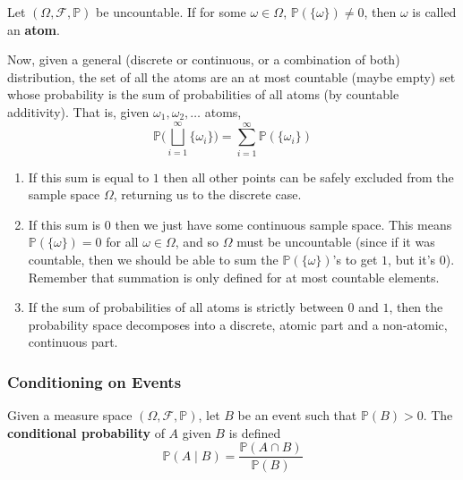 \documentclass{article}
\begin{document}
      \begin{definition}[Atom]
        Let $(\Omega, \mathcal{F}, \mathbb{P})$ be uncountable. If for some $\omega \in \Omega$, $\mathbb{P}(\{\omega\}) \neq 0$, then $\omega$ is called an \textbf{atom}. 
      \end{definition}

      Now, given a general (discrete or continuous, or a combination of both) distribution, the set of all the atoms are an at most countable (maybe empty) set whose probability is the sum of probabilities of all atoms (by countable additivity). That is, given $\omega_1, \omega_2, \ldots$ atoms, 
      \begin{equation}
        \mathbb{P} \bigg( \bigsqcup_{i=1}^\infty \{\omega_i\} \bigg) = \sum_{i=1}^\infty \mathbb{P}(\{\omega_i\})
      \end{equation}
      \begin{enumerate}
        \item If this sum is equal to $1$ then all other points can be safely excluded from the sample space $\Omega$, returning us to the discrete case. 
        \item If this sum is $0$ then we just have some continuous sample space. This means $\mathbb{P}(\{\omega\}) = 0$ for all $\omega \in \Omega$, and so $\Omega$ must be uncountable (since if it was countable, then we should be able to sum the $\mathbb{P}(\{\omega\})$'s to get $1$, but it's $0$). Remember that summation is only defined for at most countable elements. 
        \item If the sum of probabilities of all atoms is strictly between $0$ and $1$, then the probability space decomposes into a discrete, atomic part and a non-atomic, continuous part. 
      \end{enumerate}

    \subsubsection{Conditioning on Events}

      \begin{definition}
        Given a measure space $(\Omega, \mathcal{F}, \mathbb{P})$, let $B$ be an event such that $\mathbb{P}(B) > 0$. The \textbf{conditional probability} of $A$ given $B$ is defined 
        \begin{equation}
          \mathbb{P}(A \mid B) = \frac{\mathbb{P}(A \cap B)}{\mathbb{P}(B)}
        \end{equation}
      \end{definition}
\end{document}
